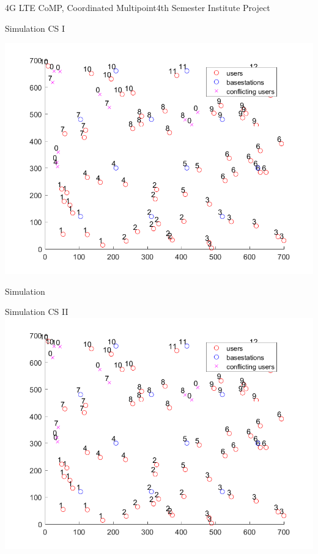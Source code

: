 \documentclass[xcolor={cmyk}]{beamer}
\begin{document}
 \begin{frame}{4G LTE CoMP, Coordinated Multipoint}{4th Semester Institute Project}
 \begin{block}{Simulation CS I}
 
 \includegraphics[width=\linewidth,height=\textheight,keepaspectratio]{MapPlotCS1.png}
 \end{block}
 \end{frame}
 
 \begin{frame}{Simulation}
 \begin{block}{Simulation CS II}
 \includegraphics[width=\linewidth,height=\textheight,keepaspectratio]{MapPlotCS2.png}
 \end{block}
 \end{frame}
 
\end{document}
